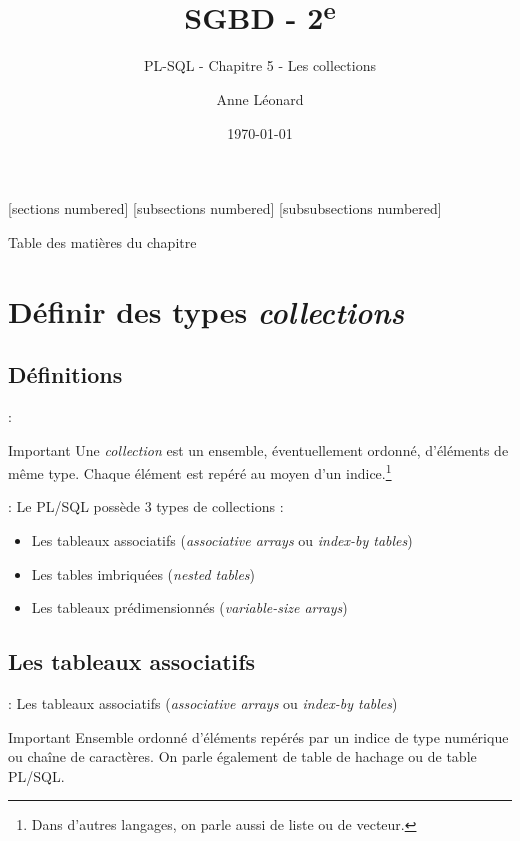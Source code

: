 \documentclass[10pt]{beamer}
\title{SGBD - 2\textsuperscript{e}}
\subtitle{PL-SQL - Chapitre 5 - Les collections}
\date{\today}
\author{Anne Léonard}
\institute{Haute École de la Province de Liège}
\begin{document}
\maketitle

[sections numbered]
[subsections numbered]
[subsubsections numbered]
\begin{frame}[allowframebreaks]{Table des matières du chapitre}
    \tableofcontents[subsectionstyle=show/show/hide,subsubsectionstyle=show/show/hide,]
\end{frame}

\section{Définir des types \textit{collections}}
\tocss
\subsection{Définitions}
\begin{frame}{\secname : \subsecname}
    \begin{alertblock}{Important}
        Une \emph{collection} est un ensemble, éventuellement ordonné, d'éléments de même type.
        Chaque élément est repéré au moyen d'un indice.\footnote{Dans d'autres langages, on parle aussi de liste ou de vecteur.}
    \end{alertblock}
\end{frame}

\begin{frame}{\secname : \subsecname}
    Le PL/SQL possède 3 types de collections :
    \begin{itemize}
        \item Les tableaux associatifs (\emph{associative arrays} ou \emph{index-by tables})
        \item Les tables imbriquées (\emph{nested tables})
        \item Les tableaux prédimensionnés (\emph{variable-size arrays})
    \end{itemize}
\end{frame}
\subsection{Les tableaux associatifs}
\begin{frame}{\secname : \subsecname}
    Les tableaux associatifs (\emph{associative arrays} ou \emph{index-by tables})
    \begin{alertblock}{Important}
        Ensemble ordonné d'éléments repérés par un indice de type numérique ou chaîne de caractères. On parle également de table de hachage ou de table PL/SQL.
    \end{alertblock}
\end{frame}
\end{document}
